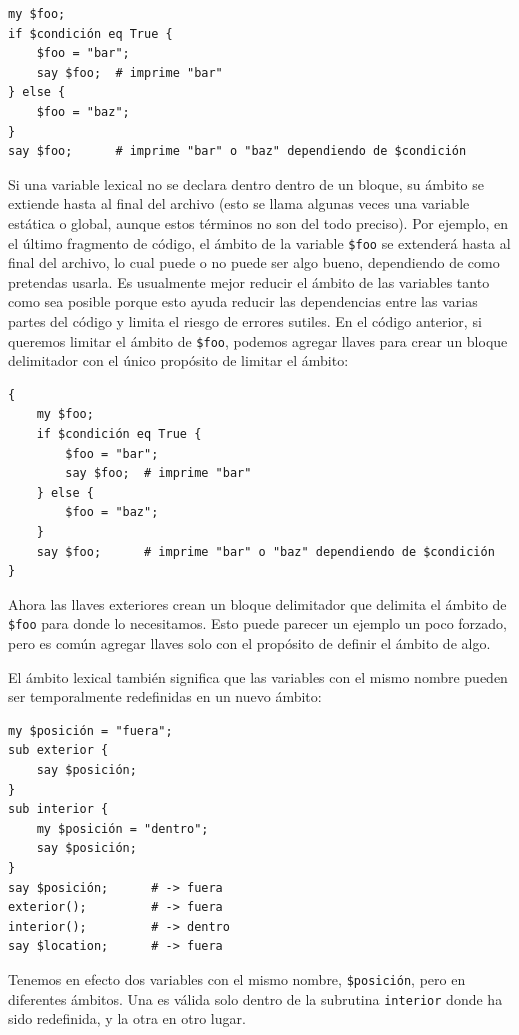 \begin{verbatim}
my $foo;
if $condición eq True {
    $foo = "bar";
    say $foo;  # imprime "bar"
} else {
    $foo = "baz";
}
say $foo;      # imprime "bar" o "baz" dependiendo de $condición
\end{verbatim}
%
Si una variable lexical no se declara dentro dentro de un
bloque, su ámbito se extiende hasta al final del archivo 
(esto se llama algunas veces una variable estática o global, aunque estos términos
no son del todo preciso). Por ejemplo, en el último fragmento de código,
el ámbito de la variable {\tt \$foo} se extenderá hasta al final del 
archivo, lo cual puede o no puede ser algo bueno, dependiendo de
como pretendas usarla. Es usualmente mejor reducir el ámbito de las 
variables tanto como sea posible porque esto ayuda reducir las dependencias
entre las varias partes del código y limita el riesgo de errores sutiles.
En el código anterior, si queremos limitar el ámbito de {\tt \$foo}, podemos
agregar llaves para crear un bloque delimitador con el único propósito de
limitar el ámbito:

\begin{verbatim}
{
    my $foo;
    if $condición eq True {
        $foo = "bar";
        say $foo;  # imprime "bar"
    } else {
        $foo = "baz";
    }
    say $foo;      # imprime "bar" o "baz" dependiendo de $condición
}
\end{verbatim}
% 
Ahora las llaves exteriores crean un bloque delimitador que delimita
el ámbito de {\tt \$foo} para donde lo necesitamos. Esto puede parecer
un ejemplo un poco forzado, pero es común agregar llaves solo con el propósito de
definir el ámbito de algo.

El ámbito lexical también significa que las variables con el mismo nombre
pueden ser temporalmente redefinidas en un nuevo ámbito:

\begin{verbatim}
my $posición = "fuera";
sub exterior {
    say $posición;
}
sub interior {
    my $posición = "dentro";
    say $posición;
}
say $posición;      # -> fuera
exterior();         # -> fuera
interior();         # -> dentro
say $location;      # -> fuera
\end{verbatim}
% 
Tenemos en efecto dos variables con el mismo nombre,
{\tt \$posición}, pero en diferentes ámbitos. Una es válida solo
dentro de la subrutina {\tt interior} donde ha sido redefinida,
y la otra en otro lugar.

